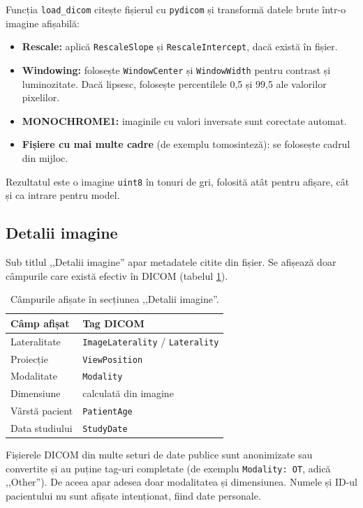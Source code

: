 \documentclass[runningheads,a4paper,11pt]{report}
\begin{document}
Funcția \texttt{load\_dicom} citește fișierul cu \texttt{pydicom} și transformă datele brute într-o imagine afișabilă:
\begin{itemize}
	\item \textbf{Rescale:} aplică \texttt{RescaleSlope} și \texttt{RescaleIntercept}, dacă există în fișier.
	\item \textbf{Windowing:} folosește \texttt{WindowCenter} și \texttt{WindowWidth} pentru contrast și luminozitate. Dacă lipsesc, folosește percentilele 0,5 și 99,5 ale valorilor pixelilor.
	\item \textbf{MONOCHROME1:} imaginile cu valori inversate sunt corectate automat.
	\item \textbf{Fișiere cu mai multe cadre} (de exemplu tomosinteză): se folosește cadrul din mijloc.
\end{itemize}
Rezultatul este o imagine \texttt{uint8} în tonuri de gri, folosită atât pentru afișare, cât și ca intrare pentru model.

\subsection{Detalii imagine}

Sub titlul ,,Detalii imagine'' apar metadatele citite din fișier. Se afișează doar câmpurile care există efectiv în DICOM (tabelul \ref{tab:dicomtags}).

\begin{table}[htbp]
	\caption{Câmpurile afișate în secțiunea ,,Detalii imagine''.}
	\label{tab:dicomtags}
	\begin{center}
		\begin{tabular}{p{5cm}p{6cm}}
			\textbf{Câmp afișat} & \textbf{Tag DICOM} \\
			\hline\hline
			Lateralitate & \texttt{ImageLaterality} / \texttt{Laterality} \\
			Proiecție & \texttt{ViewPosition} \\
			Modalitate & \texttt{Modality} \\
			Dimensiune & calculată din imagine \\
			Vârstă pacient & \texttt{PatientAge} \\
			Data studiului & \texttt{StudyDate} \\
		\end{tabular}
	\end{center}
\end{table}

Fișierele DICOM din multe seturi de date publice sunt anonimizate sau convertite și au puține tag-uri completate (de exemplu \texttt{Modality: OT}, adică ,,Other''). De aceea apar adesea doar modalitatea și dimensiunea. Numele și ID-ul pacientului nu sunt afișate intenționat, fiind date personale.
\end{document}
